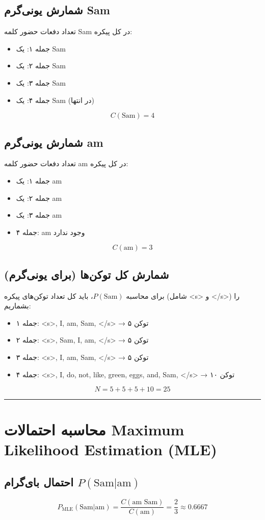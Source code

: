 \documentclass[11pt,a4paper]{article}
\newcommand{\en}[1]{\textenglish{#1}}
\newcommand{\separator}{\vspace{1em}\noindent\rule{\linewidth}{0.4pt}\vspace{1em}}
\begin{document}
\subsection*{شمارش یونی‌گرم \en{Sam}}
تعداد دفعات حضور کلمه \en{Sam} در کل پیکره:
\begin{itemize}
\item جمله ۱: یک \en{Sam}
\item جمله ۲: یک \en{Sam}
\item جمله ۳: یک \en{Sam}
\item جمله ۴: یک \en{Sam} (در انتها)
\end{itemize}
\[
C(\text{Sam}) = 4
\]

\subsection*{شمارش یونی‌گرم \en{am}}
تعداد دفعات حضور کلمه \en{am} در کل پیکره:
\begin{itemize}
\item جمله ۱: یک \en{am}
\item جمله ۲: یک \en{am}
\item جمله ۳: یک \en{am}
\item جمله ۴: \en{am} وجود ندارد
\end{itemize}
\[
C(\text{am}) = 3
\]

\subsection*{شمارش کل توکن‌ها (برای یونی‌گرم)}
برای محاسبه $P(\text{Sam})$، باید کل تعداد توکن‌های پیکره (شامل \en{<s>} و \en{</s>}) را بشماریم:
\begin{itemize}
\item جمله ۱: \en{<s>, I, am, Sam, </s>} → ۵ توکن
\item جمله ۲: \en{<s>, Sam, I, am, </s>} → ۵ توکن
\item جمله ۳: \en{<s>, I, am, Sam, </s>} → ۵ توکن
\item جمله ۴: \en{<s>, I, do, not, like, green, eggs, and, Sam, </s>} → ۱۰ توکن
\end{itemize}
\[
N = 5 + 5 + 5 + 10 = 25
\]

\separator
\section{محاسبه احتمالات \en{Maximum Likelihood Estimation (MLE)}}

\subsection*{احتمال بای‌گرام $P(\text{Sam}|\text{am})$}
\[
P_{\text{MLE}}(\text{Sam}|\text{am}) = \frac{C(\text{am Sam})}{C(\text{am})} = \frac{2}{3} \approx 0.6667
\]
\end{document}
